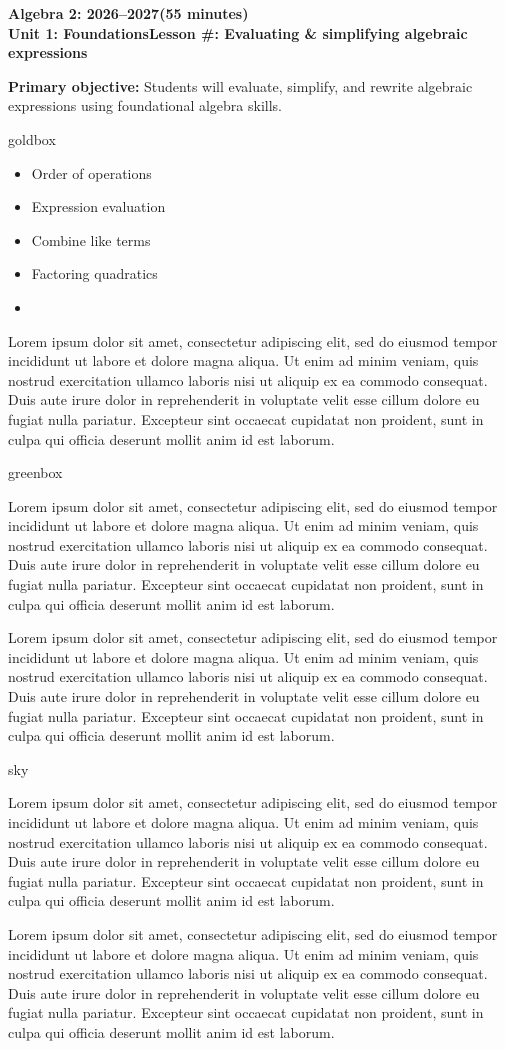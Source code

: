 \documentclass[10pt]{article}
\newcommand{\CourseName}{Algebra 2}
\newcommand{\SchoolYear}{2026--2027}
\newcommand{\MeetingLength}{55 minutes}
\newcommand{\UnitNumberName}{Unit 1: Foundations}
\newcommand{\LessonNumberName}{Lesson \#: Evaluating \& simplifying algebraic expressions}
\newcommand{\LoremIpsum}{
    Lorem ipsum dolor sit amet, consectetur adipiscing elit, sed do eiusmod
    tempor incididunt ut labore et dolore magna aliqua. Ut enim ad minim
    veniam, quis nostrud exercitation ullamco laboris nisi ut aliquip ex ea
    commodo consequat. Duis aute irure dolor in reprehenderit in voluptate
    velit esse cillum dolore eu fugiat nulla pariatur. Excepteur sint
    occaecat cupidatat non proident, sunt in culpa qui officia deserunt
    mollit anim id est laborum.
}
\begin{document}
    \begin{center}
        {\Large\bfseries \CourseName: \SchoolYear (\MeetingLength) \\
        {\small \bfseries \UnitNumberName \LessonNumberName } }
    \end{center}

    \begin{tcolorbox}[colback=sky,colframe=navy,boxrule=0.9pt,arc=2mm,left=2mm,right=2mm,top=1.5mm,bottom=1.5mm]
        \textbf{Primary objective: }
        {Students will evaluate, simplify, and rewrite algebraic expressions using
        foundational algebra skills.}
    \end{tcolorbox}

    \renewcommand{\arraystretch}{1.6}
    \begin{skillbox}{goldbox}
        \begin{minipage}[t]{0.48\linewidth}
            \begin{itemize}
                \item Order of operations
                \item Expression evaluation
                \item Combine like terms
                \item Factoring quadratics
                \item
            \end{itemize}
        \end{minipage}
        \hfill
        \begin{minipage}[t]{0.48\linewidth}
            \LoremIpsum
        \end{minipage}
    \end{skillbox}

    \renewcommand{\arraystretch}{1.6}
    \begin{skillbox}{greenbox}
        \begin{minipage}[t]{0.48\linewidth}
            \LoremIpsum
        \end{minipage}
        \hfill
        \begin{minipage}[t]{0.48\linewidth}
            \LoremIpsum
        \end{minipage}
    \end{skillbox}

    \renewcommand{\arraystretch}{1.6}
    \begin{skillbox}{sky}
        \begin{minipage}[t]{0.48\linewidth}
            \LoremIpsum
        \end{minipage}
        \hfill
        \begin{minipage}[t]{0.48\linewidth}
            \LoremIpsum
        \end{minipage}
    \end{skillbox}
\end{document}
